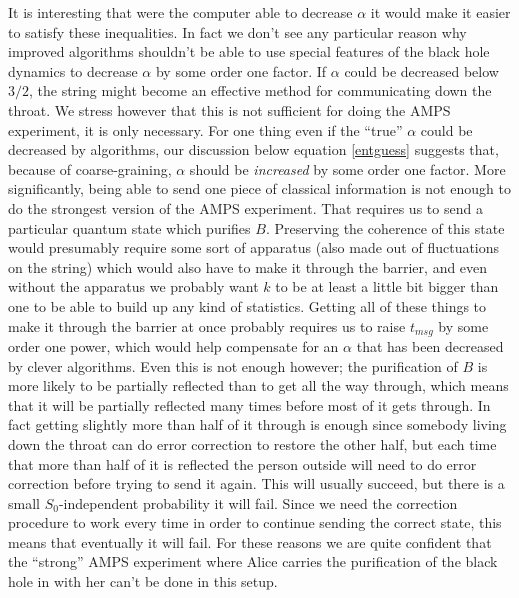 \documentclass[12pt]{article}
\begin{document}
It is interesting that were the computer able to decrease $\alpha$ it would make it easier to satisfy these inequalities.  In fact we don't see any particular reason why improved algorithms shouldn't be able to use special features of the black hole dynamics to decrease $\alpha$ by some order one factor.  If $\alpha$ could be decreased below $3/2$, the string might become an effective method for communicating down the throat.  We stress however that this is not sufficient for doing the AMPS experiment, it is only necessary.  For one thing even if the ``true'' $\alpha$ could be decreased by algorithms, our discussion below equation \eqref{entguess} suggests that, because of coarse-graining, $\alpha$ should be \textit{increased} by some order one factor.  More significantly, being able to send one piece of classical information is not enough to do the strongest version of the AMPS experiment.  That requires us to send a particular quantum state which purifies $B$.  Preserving the coherence of this state would presumably require some sort of apparatus (also made out of fluctuations on the string) which would also have to make it through the barrier, and even without the apparatus we probably want $k$ to be at least a little bit bigger than one to be able to build up any kind of statistics.  Getting all of these things to make it through the barrier at once probably requires us to raise $t_{msg}$ by some order one power, which would help compensate for an $\alpha$ that has been decreased by clever algorithms.  Even this is not enough however; the purification of $B$ is more likely to be partially reflected than to get all the way through, which means that it will be partially reflected many times before most of it gets through.  In fact getting slightly more than half of it through is enough since somebody living down the throat can do error correction to restore the other half, but each time that more than half of it is reflected the person outside will need to do error correction before trying to send it again.  This will usually succeed, but there is a small $S_0$-independent probability it will fail.  Since we need the correction procedure to work every time in order to continue sending the correct state, this means that eventually it will fail.  For these reasons we are quite confident that the ``strong'' AMPS experiment where Alice carries the purification of the black hole in with her can't be done in this setup.
\end{document}
